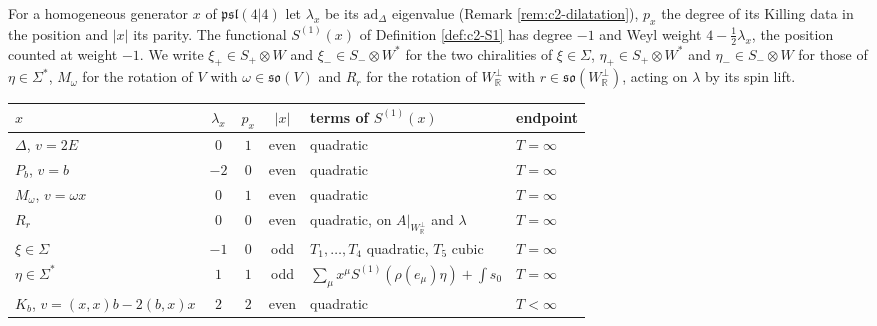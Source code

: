 \begin{definition}
\label{def:c12-gens}
For a homogeneous generator $x$ of $\mathfrak{psl}(4|4)$ let $\lambda_x$ be its $\mathrm{ad}_\Delta$ eigenvalue (Remark \ref{rem:c2-dilatation}), $p_x$ the degree of its Killing data in the position and $|x|$ its parity. The functional $S^{(1)}(x)$ of Definition \ref{def:c2-S1} has degree $-1$ and Weyl weight $4-\tfrac12\lambda_x$, the position counted at weight $-1$. We write $\xi_+\in S_+\otimes W$ and $\xi_-\in S_-\otimes W^*$ for the two chiralities of $\xi\in\Sigma$, $\eta_+\in S_+\otimes W^*$ and $\eta_-\in S_-\otimes W$ for those of $\eta\in\Sigma^*$, $M_\omega$ for the rotation of $V$ with $\omega\in\mathfrak{so}(V)$ and $R_r$ for the rotation of $W_{\mathbb R}^\perp$ with $r\in\mathfrak{so}(W_{\mathbb R}^\perp)$, acting on $\lambda$ by its spin lift.

\begin{tabular}{l|c|c|c|l|l}
$x$ & $\lambda_x$ & $p_x$ & $|x|$ & terms of $S^{(1)}(x)$ & endpoint\\
\hline
$\Delta$, $v=2E$ & $0$ & $1$ & even & quadratic & $T=\infty$\\
$P_b$, $v=b$ & $-2$ & $0$ & even & quadratic & $T=\infty$\\
$M_\omega$, $v=\omega x$ & $0$ & $1$ & even & quadratic & $T=\infty$\\
$R_r$ & $0$ & $0$ & even & quadratic, on $A|_{W_{\mathbb R}^\perp}$ and $\lambda$ & $T=\infty$\\
$\xi\in\Sigma$ & $-1$ & $0$ & odd & $T_1,\dots,T_4$ quadratic, $T_5$ cubic & $T=\infty$\\
$\eta\in\Sigma^*$ & $1$ & $1$ & odd & $\sum_\mu x^\mu S^{(1)}(\rho(e_\mu)\eta)+\int s_0$ & $T=\infty$\\
$K_b$, $v=(x,x)b-2(b,x)x$ & $2$ & $2$ & even & quadratic & $T<\infty$\\
\end{tabular}


\end{definition}
